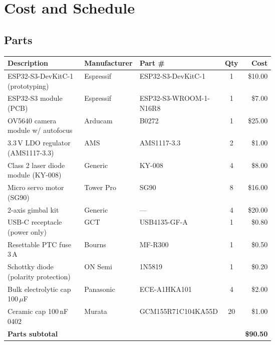 \documentclass[12pt]{extarticle}
\begin{document}
\newpage
\section{Cost and Schedule}


\subsection{Parts}

\begin{longtable}{p{0.30\linewidth} p{0.18\linewidth} p{0.14\linewidth} c r}
\toprule
\textbf{Description} & \textbf{Manufacturer} & \textbf{Part \#} & \textbf{Qty} & \textbf{Cost} \\
\midrule
\endhead
\bottomrule
\endfoot

ESP32-S3-DevKitC-1 (prototyping)     & Espressif        & ESP32-S3-DevKitC-1   & 1 & \$10.00 \\
ESP32-S3 module (PCB)                 & Espressif        & ESP32-S3-WROOM-1-N16R8 & 1 & \$7.00  \\
OV5640 camera module w/ autofocus     & Arducam          & B0272                & 1 & \$25.00 \\
3.3\,V LDO regulator (AMS1117-3.3)   & AMS              & AMS1117-3.3          & 2 & \$1.00  \\
Class 2 laser diode module (KY-008)   & Generic          & KY-008               & 4 & \$8.00  \\
Micro servo motor (SG90)              & Tower Pro        & SG90                 & 8 & \$16.00 \\
2-axis gimbal kit                     & Generic          & ---                  & 4 & \$20.00 \\
USB-C receptacle (power only)         & GCT              & USB4135-GF-A         & 1 & \$0.80  \\
Resettable PTC fuse 3\,A              & Bourns           & MF-R300              & 1 & \$0.50  \\
Schottky diode (polarity protection)  & ON Semi          & 1N5819               & 1 & \$0.20  \\
Bulk electrolytic cap 100\,$\mu$F     & Panasonic        & ECE-A1HKA101         & 4 & \$2.00  \\
Ceramic cap 100\,nF 0402              & Murata           & GCM155R71C104KA55D   & 20 & \$1.00 \\
\midrule
\textbf{Parts subtotal}               &                  &                      &   & \textbf{\$90.50} \\
\end{longtable}
\end{document}
